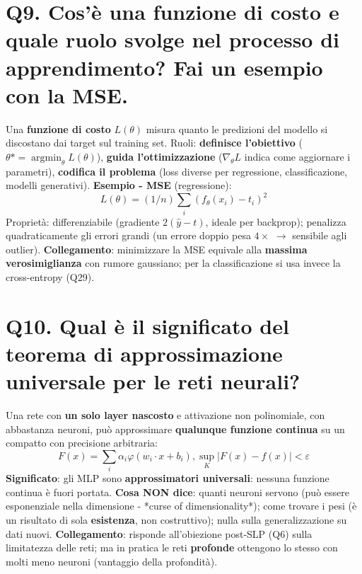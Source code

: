\documentclass[11pt,a4paper]{article}
\begin{document}
\section*{Q9. Cos'è una funzione di costo e quale ruolo svolge nel processo di apprendimento? Fai un esempio con la MSE.}
Una \textbf{funzione di costo} $L(\theta )$ misura quanto le predizioni del modello si discostano dai target sul training set. Ruoli: \textbf{definisce l'obiettivo} ($\theta * = \operatorname{argmin}_\theta  L(\theta )$), \textbf{guida l'ottimizzazione} ($\nabla _\theta  L$ indica come aggiornare i parametri), \textbf{codifica il problema} (loss diverse per regressione, classificazione, modelli generativi).
\textbf{Esempio - MSE} (regressione):
\[ L(\theta ) = (1/n) \sum _{i} (f_\theta (x_{i}) - t_{i})^{2} \]
Proprietà: differenziabile (gradiente $2(\hat{y}-t)$, ideale per backprop); penalizza quadraticamente gli errori grandi (un errore doppio pesa $4\times $ $\to $ sensibile agli outlier).
\textbf{Collegamento}: minimizzare la MSE equivale alla \textbf{massima verosimiglianza} con rumore gaussiano; per la classificazione si usa invece la cross-entropy (Q29).
\newpage
\section*{Q10. Qual è il significato del teorema di approssimazione universale per le reti neurali?}
Una rete con \textbf{un solo layer nascosto} e attivazione non polinomiale, con abbastanza neuroni, può approssimare \textbf{qualunque funzione continua} su un compatto con precisione arbitraria:
\[ F(x) = \sum _{i} \alpha _{i} \varphi (w_{i}\cdot x + b_{i}),   \operatorname{sup}_K |F(x) - f(x)| < \varepsilon  \]
\textbf{Significato}: gli MLP sono \textbf{approssimatori universali}: nessuna funzione continua è fuori portata.
\textbf{Cosa NON dice}: quanti neuroni servono (può essere esponenziale nella dimensione - *curse of dimensionality*); come trovare i pesi (è un risultato di sola \textbf{esistenza}, non costruttivo); nulla sulla generalizzazione su dati nuovi.
\textbf{Collegamento}: risponde all'obiezione post-SLP (Q6) sulla limitatezza delle reti; ma in pratica le reti \textbf{profonde} ottengono lo stesso con molti meno neuroni (vantaggio della profondità).
\newpage
\end{document}
